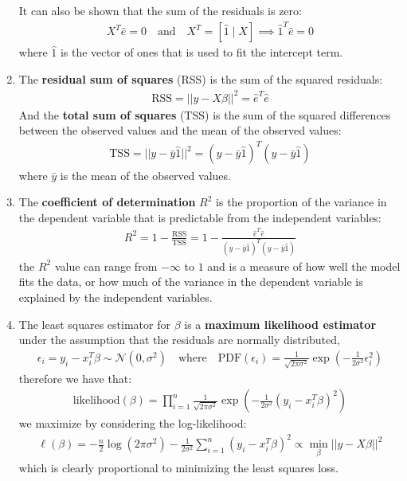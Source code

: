 \documentclass[letterpaper, 11pt]{article}
\newcommand{\normal}[2]{\mathcal{N}\left(#1,#2\right)}
\newcommand{\1}{\mathds{1}}	%
\theoremstyle{definition}
\begin{document}
\begin{enumerate}
    It can also be shown that the sum of the residuals is zero:
    \begin{align}
        X^T \hat{e} = 0 \quad \text{and} \quad X^T = [\hat{1} \; |\; X] \implies \hat{1}^T \hat{e} = 0
    \end{align}
    where $\hat{1}$ is the vector of ones that is used to fit the intercept term.
    \item The \textbf{residual sum of squares} (RSS) is the sum of the squared residuals:
    \begin{align}
        \text{RSS} = ||y - X \hat{\beta}||^2 = \hat{e}^T \hat{e}
    \end{align}
    And the \textbf{total sum of squares} (TSS) is the sum of the squared differences between the observed values and the mean of the observed values:
    \begin{align}
        \text{TSS} = ||y - \bar{y} \hat{1}||^2 = (y - \bar{y} \hat{1})^T (y - \bar{y} \hat{1})
    \end{align}
    where $\bar{y}$ is the mean of the observed values. 
    \item The \textbf{coefficient of determination} $R^2$ is the proportion of the variance in the dependent variable that is predictable from the independent variables:
    \begin{align}
        R^2 = 1 - \frac{\text{RSS}}{\text{TSS}} = 1 - \frac{\hat{e}^T \hat{e}}{(y - \bar{y} \hat{1})^T (y - \bar{y} \hat{1})}
    \end{align}
    the $R^2$ value can range from $-\infty$ to $1$ and is a measure of how well the model fits the data, or 
    how much of the variance in the dependent variable is explained by the independent variables.
    \item The least squares estimator for $\beta$ is a \textbf{maximum likelihood estimator} under the assumption that the residuals are normally distributed,
    \begin{align}
        \epsilon_i = y_i - x_i^T \beta \sim \normal{0}{\sigma^2} \quad \text{where} \quad \text{PDF}(\epsilon_i) = \frac{1}{\sqrt{2\pi \sigma^2}} \exp\left(-\frac{1}{2\sigma^2} \epsilon_i^2\right)
    \end{align}
    therefore we have that:
    \begin{align}
        \text{likelihood}(\beta) = \prod_{i=1}^{n} \frac{1}{\sqrt{2\pi \sigma^2}} \exp\left(-\frac{1}{2\sigma^2} (y_i - x_i^T \beta)^2\right)
    \end{align}
    we maximize by considering the log-likelihood:
    \begin{align}
        \ell(\beta) = -\frac{n}{2} \log(2\pi \sigma^2) - \frac{1}{2\sigma^2} \sum_{i=1}^{n} (y_i - x_i^T \beta)^2 \propto \min_{\beta} ||y - X \beta||^2
    \end{align}
    which is clearly proportional to minimizing the least squares loss. 
\end{enumerate}
\end{document}
